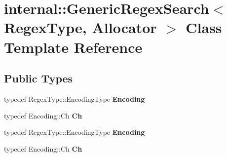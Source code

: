 \hypertarget{classinternal_1_1_generic_regex_search}{}\section{internal\+:\+:Generic\+Regex\+Search$<$ Regex\+Type, Allocator $>$ Class Template Reference}
\label{classinternal_1_1_generic_regex_search}
\subsection*{Public Types}
\begin{DoxyCompactItemize}
\item 
typedef Regex\+Type\+::\+Encoding\+Type {\bfseries Encoding}\hypertarget{classinternal_1_1_generic_regex_search_a7b1f81c580c33200c83e1529c2fdbf54}{}\label{classinternal_1_1_generic_regex_search_a7b1f81c580c33200c83e1529c2fdbf54}

\item 
typedef Encoding\+::\+Ch {\bfseries Ch}\hypertarget{classinternal_1_1_generic_regex_search_a966f3a62fc838b5e9350f4c6a624d9a1}{}\label{classinternal_1_1_generic_regex_search_a966f3a62fc838b5e9350f4c6a624d9a1}

\item 
typedef Regex\+Type\+::\+Encoding\+Type {\bfseries Encoding}\hypertarget{classinternal_1_1_generic_regex_search_a7b1f81c580c33200c83e1529c2fdbf54}{}\label{classinternal_1_1_generic_regex_search_a7b1f81c580c33200c83e1529c2fdbf54}

\item 
typedef Encoding\+::\+Ch {\bfseries Ch}\hypertarget{classinternal_1_1_generic_regex_search_a966f3a62fc838b5e9350f4c6a624d9a1}{}\label{classinternal_1_1_generic_regex_search_a966f3a62fc838b5e9350f4c6a624d9a1}

\end{DoxyCompactItemize}
